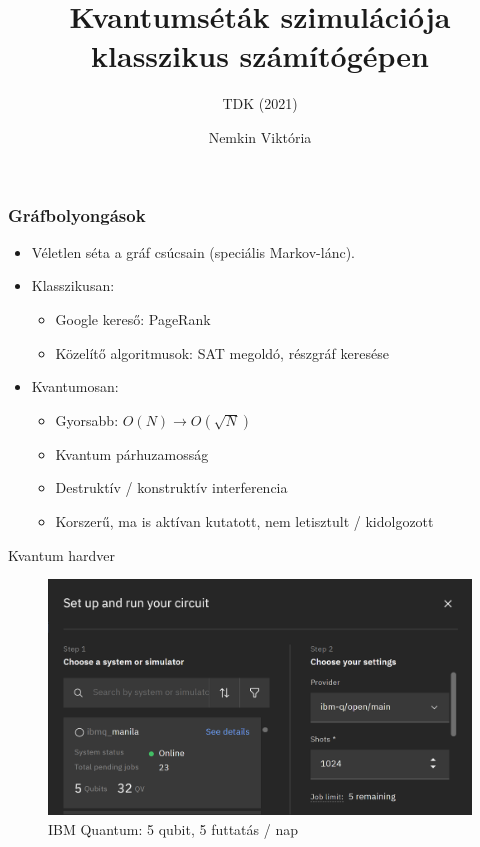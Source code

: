 \documentclass[aspectratio=169]{beamer}
\author{Nemkin Viktória}
\institute{Konzulens: dr. Friedl Katalin}
\title{Kvantumséták szimulációja klasszikus számítógépen}
\subtitle{TDK (2021)}
\date{}
\begin{document}
\frame{\titlepage}

\begin{frame}

  \frametitle{Gráfbolyongások}
  
  \begin{itemize}
    \item Véletlen séta a gráf csúcsain (speciális Markov-lánc).
    \item Klasszikusan:
    \begin{itemize}
        \item Google kereső: PageRank
        \item Közelítő algoritmusok: SAT megoldó, részgráf keresése
    \end{itemize}
    \item Kvantumosan:
    \begin{itemize}
        \item Gyorsabb: $O(N) \rightarrow O(\sqrt{N})$
        \item Kvantum párhuzamosság
        \item Destruktív / konstruktív interferencia
        \item Korszerű, ma is aktívan kutatott, nem letisztult / kidolgozott
    \end{itemize}
  \end{itemize}
\end{frame}

\begin{frame}{Kvantum hardver}
    \begin{figure}
        \includegraphics[width=0.8\linewidth]{./figures/ibm.png}
        \caption{IBM Quantum: 5 qubit, 5 futtatás / nap}
    \end{figure}
\end{frame}
\end{document}
